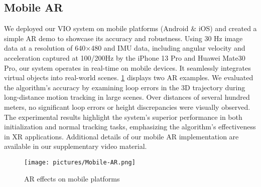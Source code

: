 \subsection{Mobile AR}
We deployed our VIO system on mobile platforms (Android \& iOS) and created a simple AR demo to showcase its accuracy and robustness. Using 30 Hz image data at a resolution of 640×480 and IMU data, including angular velocity and acceleration captured at 100/200Hz by the iPhone 13 Pro and Huawei Mate30 Pro, our system operates in real-time on mobile devices. It seamlessly integrates virtual objects into real-world scenes. \cref{fig:fancy AR demo} displays two AR examples. We evaluated the algorithm's accuracy by examining loop errors in the 3D trajectory during long-distance motion tracking in large scenes. Over distances of several hundred meters, no significant loop errors or height discrepancies were visually observed. The experimental results highlight the system's superior performance in both initialization and normal tracking tasks, emphasizing the algorithm's effectiveness in XR applications. Additional details of our mobile AR implementation are available in our supplementary video material.
\begin{figure}
    \centering
    \texttt{[image: pictures/Mobile-AR.png]}
    \caption{AR effects on mobile platforms}
    \label{fig:fancy AR demo}
\end{figure}
